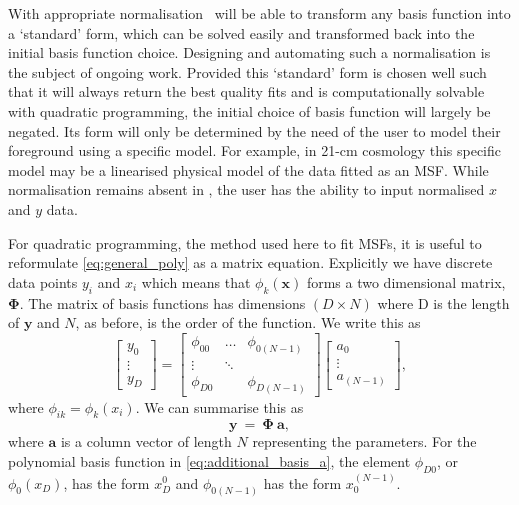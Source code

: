 With appropriate normalisation \maxsmooth~will be able to transform any basis function into a `standard' form, which can be solved easily and transformed back into the initial basis function choice. Designing and automating such a normalisation is the subject of ongoing work. Provided this `standard' form is chosen well such that it will always return the best quality fits and is computationally solvable with quadratic programming, the initial choice of basis function will largely be negated. Its form will only be determined by the need of the user to model their foreground using a specific model. For example, in 21-cm cosmology this specific model may be a linearised physical model of the data fitted as an MSF. While normalisation remains absent in \maxsmooth, the user has the ability to input normalised $x$ and $y$ data.

For quadratic programming, the method used here to fit MSFs, it is useful to reformulate \cref{eq:general_poly} as a matrix equation. Explicitly we have discrete data points $y_i$ and $x_i$ which means that $\phi_k(\mathbf{x})$ forms a two dimensional matrix, $\mathbf{\Phi}$. The matrix of basis functions has dimensions $(D\times N)$ where D is the length of $\mathbf{y}$ and $N$, as before, is the order of the function. We write this as
\begin{equation}
    \begin{bmatrix}
    y_0 \\ \vdots \\ y_D
    \end{bmatrix}
    =
    \begin{bmatrix}
    \phi_{00} & \dots & \phi_{0(N-1)} \\
    \vdots & \ddots & \\
    \phi_{D0} & & \phi_{D(N-1)}
    \end{bmatrix}
    \begin{bmatrix}
    a_0 \\ \vdots \\ a_{(N-1)}
    \end{bmatrix},
\end{equation}
where $\phi_{ik} = \phi_k(x_i)$. We can summarise this as
\begin{equation}
    \mathbf{y}~=~\mathbf{\Phi}~\mathbf{a},
    \label{eq:gen_poly_matrix}
\end{equation}
where $\mathbf{a}$ is a column vector of length $N$ representing the parameters. For the polynomial basis function in \cref{eq:additional_basis_a}, the element $\phi_{D0}$, or $\phi_0(x_D)$, has the form $x_D^0$ and $\phi_{0(N-1)}$ has the form $x_0^{(N-1)}$.

